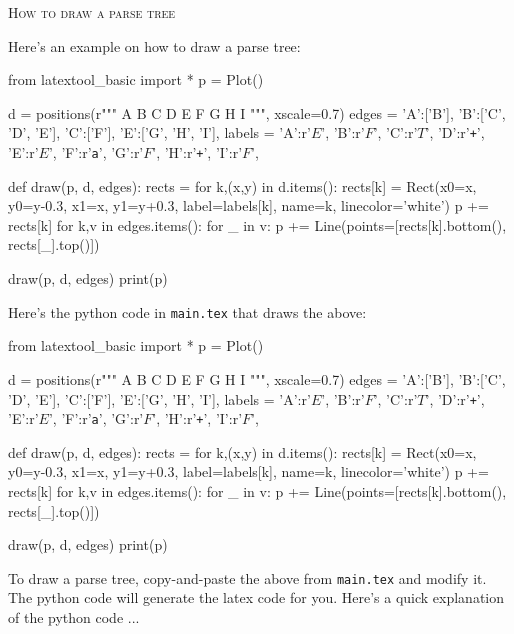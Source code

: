 \newpage
\textsc{How to draw a parse tree}

Here's an example on how to draw a parse tree:

\begin{python}
from latextool_basic import *
p = Plot()

d = positions(r"""
   A
   B
C  D  E
F   G H I
""", xscale=0.7)
edges = {'A':['B'],
  'B':['C', 'D', 'E'],
  'C':['F'],
  'E':['G', 'H', 'I'],
  }
labels = {'A':r'$E$',
  'B':r'$F$',
  'C':r'$T$',
  'D':r'\texttt{+}',
  'E':r'$E$',
  'F':r'\texttt{a}',
  'G':r'$F$',
  'H':r'\texttt{+}',
  'I':r'$F$',
}

def draw(p, d, edges):
    rects = {}
    for k,(x,y) in d.items():
        rects[k] = Rect(x0=x, y0=y-0.3, x1=x, y1=y+0.3, label=labels[k],
                        name=k, linecolor='white')
        p += rects[k]
    for k,v in edges.items():
        for _ in v:
            p += Line(points=[rects[k].bottom(), rects[_].top()])

draw(p, d, edges)
print(p)
\end{python}
Here's the python code in \verb!main.tex! that draws the above:
\begin{console}
\begin{python}
from latextool_basic import *
p = Plot()

d = positions(r"""
   A
   B
C  D  E
F   G H I
""", xscale=0.7)
edges = {'A':['B'],
  'B':['C', 'D', 'E'],
  'C':['F'],
  'E':['G', 'H', 'I'],
  }
labels = {'A':r'$E$',
  'B':r'$F$',
  'C':r'$T$',
  'D':r'\texttt{+}',
  'E':r'$E$',
  'F':r'\texttt{a}',
  'G':r'$F$',
  'H':r'\texttt{+}',
  'I':r'$F$',
}

def draw(p, d, edges):
    rects = {}
    for k,(x,y) in d.items():
        rects[k] = Rect(x0=x, y0=y-0.3, x1=x, y1=y+0.3, label=labels[k],
                        name=k, linecolor='white')
        p += rects[k]
    for k,v in edges.items():
        for _ in v:
            p += Line(points=[rects[k].bottom(), rects[_].top()])

draw(p, d, edges)
print(p)
\end{python}
\end{console}

To draw a parse tree, copy-and-paste the above from \verb!main.tex! and modify it.
The python code will generate the latex code for you.
Here's a quick explanation of the python code ...

